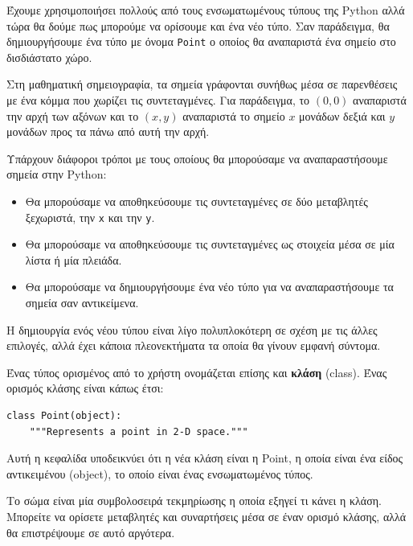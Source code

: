 \documentclass[10pt]{book}
\begin{document}
Έχουμε χρησιμοποιήσει πολλούς από τους ενσωματωμένους τύπους της Python αλλά τώρα
θα δούμε πως μπορούμε να ορίσουμε και ένα νέο τύπο. Σαν παράδειγμα, θα δημιουργήσουμε
ένα τύπο με όνομα {\tt Point} ο οποίος θα αναπαριστά ένα σημείο στο δισδιάστατο χώρο.

Στη μαθηματική σημειογραφία, τα σημεία γράφονται συνήθως μέσα σε παρενθέσεις με ένα κόμμα
που χωρίζει τις συντεταγμένες. Για παράδειγμα, το $(0,0)$ αναπαριστά την αρχή των αξόνων και
το $(x,y)$ αναπαριστά το σημείο $x$ μονάδων δεξιά και $y$ μονάδων προς τα πάνω από αυτή την αρχή.

Υπάρχουν διάφοροι τρόποι με τους οποίους θα μπορούσαμε να αναπαραστήσουμε σημεία στην Python:

\begin{itemize}


\item Θα μπορούσαμε να αποθηκεύσουμε τις συντεταγμένες σε δύο μεταβλητές ξεχωριστά, την {\tt x} και την {\tt y}. 

\item Θα μπορούσαμε να αποθηκεύσουμε τις συντεταγμένες ως στοιχεία μέσα σε μία λίστα ή μία πλειάδα.

\item Θα μπορούσαμε να δημιουργήσουμε ένα νέο τύπο για να αναπαραστήσουμε τα σημεία σαν αντικείμενα.
 
\end{itemize}

Η δημιουργία ενός νέου τύπου είναι λίγο πολυπλοκότερη σε σχέση με τις άλλες επιλογές, αλλά 
έχει κάποια πλεονεκτήματα τα οποία θα γίνουν εμφανή σύντομα.

Ένας τύπος ορισμένος από το χρήστη ονομάζεται επίσης και {\bf κλάση} (class).
Ένας ορισμός κλάσης είναι κάπως έτσι:

\begin{verbatim}
class Point(object):
    """Represents a point in 2-D space."""
\end{verbatim}
%
Αυτή η κεφαλίδα υποδεικνύει ότι η νέα κλάση είναι η Point, η οποία είναι ένα είδος 
αντικειμένου (object), το οποίο είναι ένας ενσωματωμένος τύπος.

Το σώμα είναι μία συμβολοσειρά τεκμηρίωσης η οποία εξηγεί τι κάνει η κλάση. Μπορείτε να ορίσετε
μεταβλητές και συναρτήσεις μέσα σε έναν ορισμό κλάσης, αλλά θα επιστρέψουμε σε αυτό αργότερα.
\end{document}
